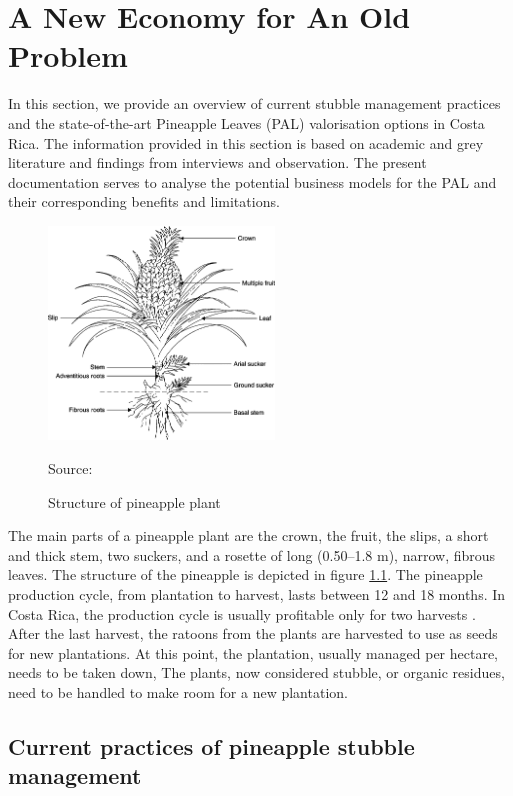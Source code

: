 \chapter{A New Economy for An Old Problem}
\label{neweconomy}

In this section, we provide an overview of current stubble management practices and the state-of-the-art Pineapple Leaves (PAL) valorisation options in Costa Rica. The information provided in this section is based on academic and grey literature and findings from interviews and observation. The present documentation serves to analyse the potential business models for the PAL and their corresponding benefits and limitations. 

\begin{figure}[H]
\caption{Structure of pineapple plant}
\label{pineappleStructure}
\centering
\includegraphics[width=6cm]{fig/pineappleStructure.png}

\scriptsize Source: \cite{hassan2011pineapple}
\end{figure}

The main parts of a pineapple plant are the crown, the fruit, the slips, a short and thick stem, two suckers, and a rosette of long (0.50–1.8 m), narrow, fibrous leaves. The structure of the pineapple is depicted in figure \ref{pineappleStructure}. The pineapple production cycle, from plantation to harvest, lasts between 12 and 18 months. In Costa Rica, the production cycle is usually profitable only for two harvests \citep{ingwersen2012life, magHarvest, zhang2016phenological}. After the last harvest, the ratoons from the plants are harvested to use as seeds for new plantations. At this point, the plantation, usually managed per hectare, needs to be taken down, The plants, now considered stubble, or organic residues, need to be handled to make room for a new plantation.

\section{Current practices of pineapple stubble management}

